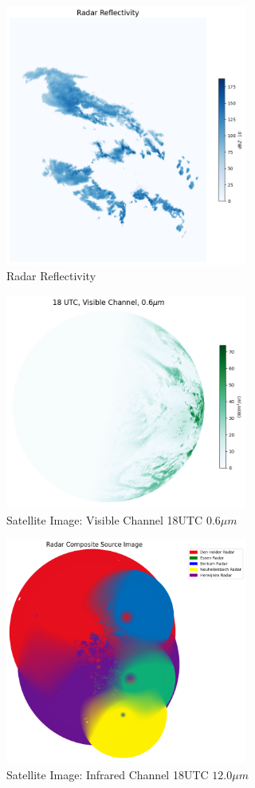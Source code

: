\begin{figure}
  \centering
  \includegraphics[width=225pt]{./images/radar_reflectivity.png}
  \caption{Radar Reflectivity}
  \Description{}
  \label{fig:reflect}
\end{figure}

\begin{figure}
  \centering
  \includegraphics[width=225pt]{./images/vis_006.png}
  \caption{Satellite Image: Visible Channel 18UTC $0.6\mu m$}
  \Description{}
  \label{fig:vis}
\end{figure}

\begin{figure}
  \centering
  \includegraphics[width=225pt]{./images/radar_source.png}
  \caption{Satellite Image: Infrared Channel 18UTC $12.0\mu m$}
  \Description{}
  \label{fig:source}
\end{figure}


